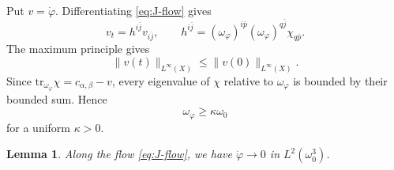 \documentclass[reqno]{amsart}
\theoremstyle{remark}
\def\tr{\text{tr}}
\newcommand{\cab}{c_{\alpha,\beta}}
\theoremstyle{plain}
\newtheorem{lemma}[thm]{Lemma}
\begin{document}
Put $v=\dot\varphi$.  Differentiating \eqref{eq:J-flow} gives
\begin{equation}\label{eq:v-equation}
 v_t=h^{i\bar j}v_{i\bar j},\qquad
 h^{i\bar j}=(\omega_\varphi)^{i\bar p}
       (\omega_\varphi)^{q\bar j}\chi_{q\bar p}.
\end{equation}
The maximum principle gives
\begin{equation}\label{eq:v-bound}
 \|v(t)\|_{L^\infty(X)}
 \leq\|v(0)\|_{L^\infty(X)}.
\end{equation}
Since $\tr_{\omega_\varphi}\chi=\cab-v$, every eigenvalue of
$\chi$ relative to $\omega_\varphi$ is bounded by their bounded
sum.  Hence
\begin{equation}\label{eq:metric-lower}
 \omega_\varphi\geq\kappa\omega_0
\end{equation}
for a uniform $\kappa>0$.
\begin{lemma}\label{lem:v-decay}
    Along the flow \eqref{eq:J-flow}, we have $\dot\varphi\to 0$ 
in $L^2(\omega_0^3)$. \end{lemma}
\end{document}

